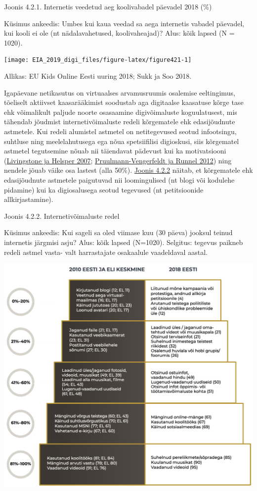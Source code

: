 \documentclass[estonian,]{article}
\begin{document}
{Joonis 4.2.1.} Internetis veedetud aeg koolivabadel päevadel 2018 (\%)

Küsimus ankeedis: Umbes kui kaua veedad sa aega internetis vabadel päevadel, kui kooli ei ole (nt nädalavahetused, koolivaheajad)?
Alus: kõik lapsed (N = 1020).

\begin{center}\texttt{[image: EIA\_2019\_digi\_files/figure-latex/figure421-1]} \end{center}

\begin{imgsource}
{Allikas:} EU Kids Online Eesti uuring 2018; Sukk ja Soo 2018.
\end{imgsource}

Igapäevane netikasutus on virtuaalses arvamusruumis osalemise eeltingimus, tõeliselt aktiivset kaasarääkimist soodustab aga digitaalse kaasatuse kõrge tase ehk võimalikult paljude noorte osasaamine digivõimaluste koguulatusest, mis tähendab jõudmist internetivõimaluste redeli kõrgematele ehk edasijõudnute astmetele. Kui redeli alumistel astmetel on netitegevused seotud infootsingu, suhtluse ning meelelahutusega ega nõua spetsiifilisi digioskusi, siis kõrgematel astmetel tegutsemine nõuab nii täiendavat pädevust kui ka motivatsiooni (\protect\hyperlink{Livingstone2007}{Livingstone ja Helsper 2007}; \protect\hyperlink{Pruulmann-Vengerfeldt2012}{Pruulmann-Vengerfeldt ja Runnel 2012}) ning nendele jõuab väike osa lastest (alla 50\%). \protect\hyperlink{figure422}{Joonis 4.2.2} näitab, et kõrgematele ehk edasijõudnute astmetele paigutuvad nii loomingulised (nt blogi või kodulehe pidamine) kui ka digiosalusega seotud tegevused (nt petitsioonide allkirjastamine).

{Joonis 4.2.2.} Internetivõimaluste redel

Küsimus ankeedis: Kui sageli sa oled viimase kuu (30 päeva) jooksul teinud internetis järgmisi asju? Alus: kõik lapsed (N=1020). Selgitus: tegevus paikneb redeli astmel vasta- valt harrastajate osakaalule vaadeldaval aastal.

\begin{center}\includegraphics[width=0.8\linewidth]{figures/4-chapter/fig422} \end{center}
\end{document}
